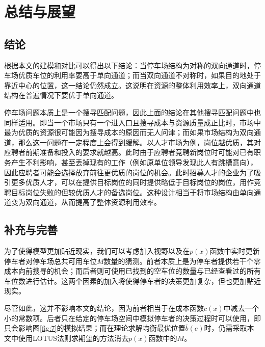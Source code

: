 \documentclass{thuemp}
\begin{document}
\section{总结与展望}
\subsection{结论}
\par 根据本文的建模和对比可以得出以下结论：当停车场结构为对称的双向通道时，停车场优质车位的利用率要高于单向通道；而当双向通道不对称时，如果目的地处于靠近中心的位置，这一结论仍然成立。这说明在资源的整体利用效率上，双向通道结构在普遍情况下要优于单向通道。
\par 停车场问题本质上是一个搜寻匹配问题，因此上面的结论在其他搜寻匹配问题中也同样适用。即当一个市场只有一个进入口且搜寻成本与资源质量成正比时，市场中最为优质的资源很可能因为搜寻成本的原因而无人问津；而如果市场结构为双向通道，那么这一问题在一定程度上会得到缓解。以人才市场为例，岗位越优质，其对应聘者前期准备和投入的要求就越高。此时由于应聘者竞聘新岗位时可能对已有职务产生不利影响，甚至丢掉现有的工作（例如原单位领导发现此人有跳槽意向），因此应聘者可能会选择放弃前往更优质的岗位的机会。此时招募人才的企业为了吸引更多优质人才，可以在提供目标岗位的同时提供略低于目标岗位的岗位，用作竞聘目标岗位失败的但较优质人才的备选岗位。这种设计相当于将市场结构由单向通道变为双向通道，从而提高了整体资源利用效率。

\subsection{补充与完善}
\par 为了使得模型更加贴近现实，我们可以考虑加入视野以及在$p(x)$函数中实时更新停车者对停车场总共可用车位$M$数量的猜测。前者本质上是为停车者提供若干个零成本向前搜寻的机会；而后者则可使用已找到的空车位的数量与已经查看过的所有车位数进行估计。这两个因素的加入将使得停车者的决策更加复杂，但也更加贴近现实。
\par 尽管如此，这并不影响本文的结论，因为前者相当于在成本函数$c(x)$中减去一个小的常数项。后者只在给定的停车场空间中模拟停车者的决策过程时可以使用，即只会影响图\ref{fig:7}的模拟结果；而在理论求解均衡最优位置$\bar{b}(e)$时，仍需采取本文中使用LOTUS法则求期望的方法消去$p(x)$函数中的$M$。




 
\end{document}
